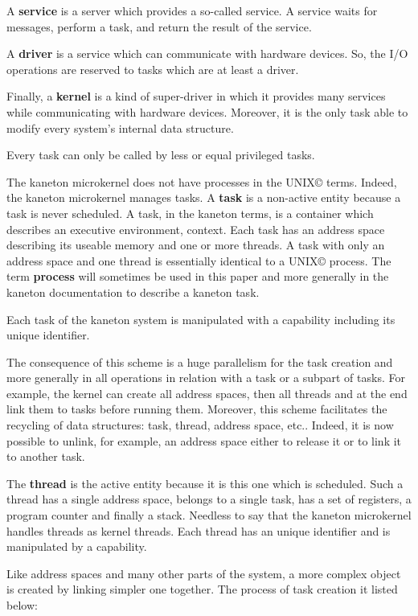 \documentclass[10pt,a4wide]{article}
\begin{document}
\begin{multicols}{2}
A \textbf{service} is a server which provides a so-called service. A service
waits for messages, perform a task, and return the result of the service.

A \textbf{driver} is a service which can communicate with hardware devices.
So, the I/O operations are reserved to tasks which are at least a driver.

Finally, a \textbf{kernel} is a kind of super-driver in which it provides
many services while communicating with hardware devices. Moreover, it is
the only task able to modify every system's internal data structure.

Every task can only be called by less or equal privileged tasks.

The kaneton microkernel does not have processes in the
UNIX{\scriptsize \copyright} terms. Indeed, the kaneton microkernel manages
tasks. A \textbf{task} is a non-active entity because a task is never scheduled.
A task, in the kaneton terms, is a container which describes an executive
environment, context. Each task has an address space describing its useable
memory and one or more threads. A task with only an address space and one
thread is essentially identical to a UNIX{\scriptsize \copyright} process.
The term \textbf{process} will sometimes be used in this paper and more
generally in the kaneton documentation to describe a kaneton task.

Each task of the kaneton system is manipulated with a capability including
its unique identifier.

The consequence of this scheme is a huge parallelism for the
task creation and more generally in all operations in relation with
a task or a subpart of tasks. For example, the kernel can create all
address spaces, then all threads and at the end link them to tasks before
running them. Moreover, this scheme facilitates the recycling of data
structures: task, thread, address space, etc.. Indeed, it is now possible to
unlink, for example, an address space either to release it or to link it to
another task.

The \textbf{thread} is the active entity because it is this one which is
scheduled. Such a thread has a single address space, belongs to a single
task, has a set of registers, a program counter and finally a stack.
Needless to say that the kaneton microkernel handles threads as kernel threads.
Each thread has an unique identifier and is manipulated by a capability.

Like address spaces and many other parts of the system, a more complex
object is created by linking simpler one together. The process of task creation
it listed below:


\end{multicols}
\end{document}
